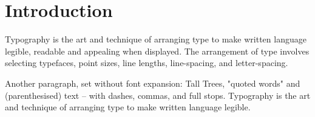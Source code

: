\documentclass{article}
\begin{document}
\section{Introduction}
Typography is the art and technique of arranging type to make written language legible, readable and appealing when displayed. The arrangement of type involves selecting typefaces, point sizes, line lengths, line-spacing, and letter-spacing.

Another paragraph, set without font expansion: Tall Trees, "quoted words" and (parenthesised) text -- with dashes, commas, and full stops. Typography is the art and technique of arranging type to make written language legible.
\end{document}
